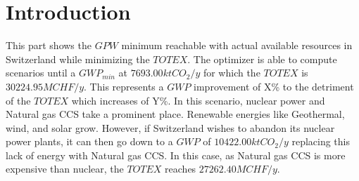 \documentclass[12pt, a4paper ]{article}
\begin{document}
\section{Introduction}
This part shows the $GPW$ minimum reachable with actual available resources in Switzerland while minimizing the $TOTEX$.
The optimizer is able to compute scenarios until a $GWP_{min}$ at $7693.00 ktCO_2/y$ for which the $TOTEX$ is $30224.95 MCHF/y$.
This represents a $GWP$ improvement of X\% to the detriment of the $TOTEX$ which increases of Y\%.
In this scenario, nuclear power and Natural gas CCS take a prominent place. Renewable energies like Geothermal, wind, and solar grow. 
However, if Switzerland wishes to abandon its nuclear power plants, it can then go down to a $GWP$ of $10422.00 ktCO_2/y$ replacing this lack of energy with Natural gas CCS. 
In this case, as Natural gas CCS is more expensive than nuclear, the $TOTEX$ reaches $27262.40 MCHF/y$.
\end{document}
